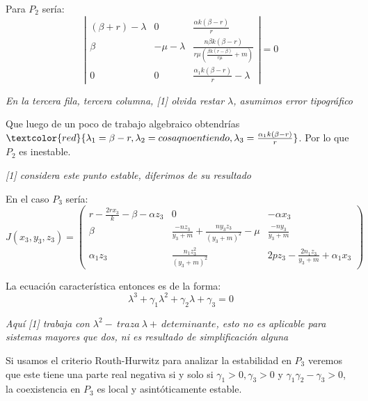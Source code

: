 \documentclass{wscpaperproc}
\theoremstyle{wsc}
\begin{document}
\vspace*{0.5cm}

Para $P_2$ sería:
$$\left|
	\begin{array}{ccc}
		(\beta+r)-\lambda & 0            & \frac{\alpha k(\beta-r)}{r}                                      \\
		\beta             & -\mu-\lambda & \frac{n\beta k(\beta-r)}{r\mu (\frac{\beta k(r-\beta)}{r\mu}+m)} \\
		0                 & 0            & \frac{\alpha_1 k(\beta-r)}{r}-\lambda
	\end{array}
	\right| =0$$

{\it En la tercera fila, tercera columna, [1] olvida restar $\lambda$, asumimos error tipográfico}

Que luego de un poco de trabajo algebraico obtendrías $\textcolor{red}{\lambda_1=\beta-r, \lambda_2=cosa q no entiendo, \lambda_3=\frac{\alpha_1 k(\beta-r)}{r}}$. Por lo que $P_2$ es inestable.

	{\it [1] considera este punto estable, diferimos de su resultado}


\vspace*{0.5cm}

En el caso $P_3$ sería:
$$ J(x_3, y_3, z_3) = \left(
	\begin{array}{ccc}
			r-\frac{2rx_3}{k}-\beta-\alpha z_3 & 0                                                 & -\alpha x_3                             \\
			\beta                              & \frac{-nz_3}{y_3+m}+\frac{ny_3z_3}{(y_3+m)^2}-\mu & \frac{-ny_3}{y_3+m}                     \\
			\alpha_1z_3                        & \frac{n_1z_3^2}{(y_3+m)^2}                        & 2pz_3-\frac{2n_1z_3}{y_3+m}+\alpha_1x_3
		\end{array}
	\right)$$

La ecuación característica entonces es de la forma:
$$\lambda^3+\gamma_1\lambda^2+\gamma_2\lambda+\gamma_3=0 $$

{\it Aquí [1] trabaja con $\lambda^2-\ traza\ \lambda+\ deteminante$, esto no es aplicable para sistemas mayores que dos, ni
es resultado de simplificación alguna}

Si usamos el criterio Routh-Hurwitz para analizar la estabilidad en $P_3$ veremos que este
tiene una parte real negativa si y solo si $\gamma_1>0, \gamma_3>0$ y $\gamma_1\gamma_2-\gamma_3>0$, la coexistencia en $P_3$ es local
y asintóticamente estable.

\vspace*{3cm}
\end{document}
